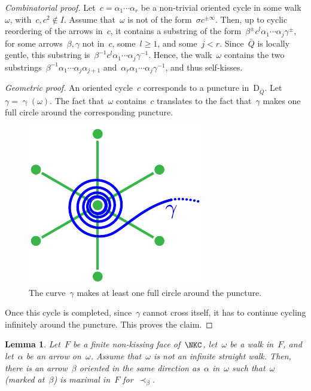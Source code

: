 \documentclass{amsart}
\newtheorem{lemma}[theorem]{Lemma}
\theoremstyle{definition}
\newcommand{\para}[1]{\medskip\noindent\textit{#1.}} %
\newcommand{\dissection}{\mathrm{D}} %
\newcommand{\curveof}{\operatorname{\gamma}} %
\begin{document}
\begin{proof}[Combinatorial proof]
Let~$c=\alpha_1\cdots\alpha_r$ be a non-trivial oriented cycle in some walk~$\omega$, with~$c, c^2\notin I$.
Assume that~$\omega$ is not of the form~$\sigma c^{\pm\infty}$.
Then, up to cyclic reordering of the arrows in~$c$, it contains a substring of the form~$\beta^\pm c^l \alpha_1\cdots\alpha_j\gamma^\pm$, for some arrows~$\beta,\gamma$ not in~$c$, some~$l\geq 1$, and some~$j<r$.
Since~$\bar Q$ is locally gentle, this substring is~$\beta^{-1} c^l \alpha_1\cdots\alpha_j\gamma^{-1}$.
Hence, the walk~$\omega$ contains the two substrings~$\beta^{-1}\alpha_1\cdots\alpha_j\alpha_{j+1}$ and~$\alpha_r\alpha_1\cdots\alpha_j\gamma^{-1}$, and thus self-kisses.

\para{Geometric proof}
An oriented cycle~$c$ corresponds to a puncture in~$\dissection_{\bar Q}$.
Let~$\gamma = \curveof(\omega)$.  The fact that~$\omega$ contains~$c$ translates to the fact that~$\gamma$ makes one full circle around the corresponding puncture.

\begin{figure}[h]
	\capstart
	\centerline{\includegraphics[scale=.7]{infiniteCurve2.pdf}}
	\caption{The curve~$\gamma$ makes at least one full circle around the puncture.}
	\label{fig:aroundPuncture1}
\end{figure}

Once this cycle is completed, since~$\gamma$ cannot cross itself, it has to continue cycling infinitely around the puncture.  This proves the claim.
\end{proof}

\begin{lemma}\label{lem:ExistenceOfDistinguishedArrows}
Let~$F$ be a finite non-kissing face of~$\NKC$, let~$\omega$ be a walk in~$F$, and let~$\alpha$ be an arrow on~$\omega$.
Assume that~$\omega$ is not an infinite straight walk.
Then, there is an arrow~$\beta$ oriented in the same direction as~$\alpha$ in~$\omega$ such that~$\omega$ (marked at~$\beta$) is maximal in~$F$ for~$\prec_\beta$.
\end{lemma}
\end{document}
